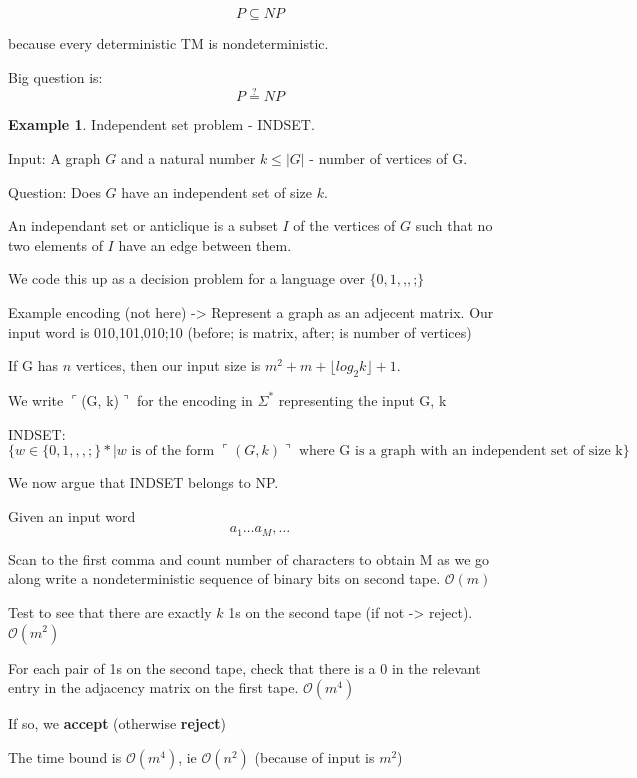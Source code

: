 \documentclass[a4paper,12pt]{article}
\theoremstyle{definition}
\newtheorem{example}[counter]{Example}
\theoremstyle{remark}
\begin{document}
\begin{equation*}
    P \subseteq NP
\end{equation*}

because every deterministic TM is nondeterministic.

Big question is:
\begin{equation*}
    P \stackrel{?}{=} NP
\end{equation*}

\begin{example}
    Independent set problem - INDSET.

    Input: A graph $G$ and a natural number $k \leq |G|$ - number of vertices of G.

    Question: Does $G$ have an independent set of size $k$.

    An independant set or anticlique is a subset $I$ of the vertices of $G$ such that no two elements of $I$ have an edge between them.

    We code this up as a decision problem for a language over $\{0, 1, \texttt{,}, \texttt{;}\}$

    Example encoding (not here) ->
    Represent a graph as an adjecent matrix.
    Our input word is 010,101,010;10 (before; is matrix, after; is number of vertices)

    If G has $n$ vertices, then our input size is $m^2 + m + \lfloor log_2 k \rfloor + 1$.

    We write $\ulcorner$(G, k)$\urcorner$ for the encoding in $\Sigma^*$ representing the input G, k

    INDSET:
    \begin{dmath*}
        \{w \in \{0, 1, ,, ;\}* | w \text{ is of the form } \ulcorner (G, k) \urcorner \text{ where G is a graph with an independent set of size k}\}
    \end{dmath*}

    We now argue that INDSET belongs to NP.

    Given an input word
    \begin{equation*}
        a_1 \dots a_M, \dots
    \end{equation*}

    Scan to the first comma and count number of characters to obtain M as we go along write a nondeterministic sequence of binary bits on second tape. $\mathscr{O}(m)$

    Test to see that there are exactly $k$ 1s on the second tape (if not -> reject). $\mathscr{O}(m^2)$

    For each pair of 1s on the second tape, check that there is a $0$ in the relevant entry in the adjacency matrix on the first tape. $\mathscr{O}(m^4)$

    If so, we \textbf{accept} (otherwise \textbf{reject})

    The time bound is $\mathscr{O}(m^4)$, ie $\mathscr{O}(n^2)$ (because of input is $m^2$)
\end{example}
\end{document}
